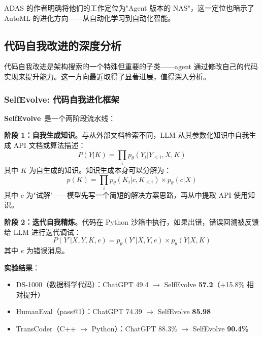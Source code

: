 ADAS 的作者明确将他们的工作定位为"Agent 版本的 NAS"，这一定位也暗示了 AutoML 的进化方向——从自动化学习到自动化智能。

\subsection{代码自我改进的深度分析}\label{sec:ch3-code-selfevolve}

代码自我改进是架构搜索的一个特殊但重要的子类——agent 通过修改自己的代码实现来提升能力。这一方向最近取得了显著进展，值得深入分析。

\subsubsection{SelfEvolve: 代码自我进化框架}

\textbf{SelfEvolve}~\citep{selfevolve2023}是一个两阶段流水线：

\textbf{阶段 1：自我生成知识}。与从外部文档检索不同，LLM 从其参数化知识中自我生成 API 文档或算法描述：
\begin{equation}
P(Y|K) = \prod_i p_\theta(Y_i | Y_{<i}, X, K)
\label{eq:selfevolve-knowledge}
\end{equation}
其中 $K$ 为自生成的知识。知识生成本身可以分解为：
\begin{equation}
p(K) = \prod_i p_\theta(K_i | c, K_{<i}) \times p_\theta(c | X)
\label{eq:selfevolve-decompose}
\end{equation}
其中 $c$ 为"试解"——模型先写一个简短的解决方案思路，再从中提取 API 使用知识。

\textbf{阶段 2：迭代自我精炼}。代码在 Python 沙箱中执行，如果出错，错误回溯被反馈给 LLM 进行迭代调试：
\begin{equation}
P(Y'|X,Y,K,e) = p_\theta(Y'|X,Y,e) \times p_\theta(Y|X,K)
\label{eq:selfevolve-refine}
\end{equation}
其中 $e$ 为错误消息。

\textbf{实验结果}：
\begin{itemize}
\item DS-1000（数据科学代码）：ChatGPT 49.4 $\rightarrow$ SelfEvolve \textbf{57.2}（+15.8\% 相对提升）
\item HumanEval（pass@1）：ChatGPT 74.39 $\rightarrow$ SelfEvolve \textbf{85.98}
\item TransCoder（C++ $\rightarrow$ Python）：ChatGPT 88.3\% $\rightarrow$ SelfEvolve \textbf{90.4\%}
\end{itemize}

